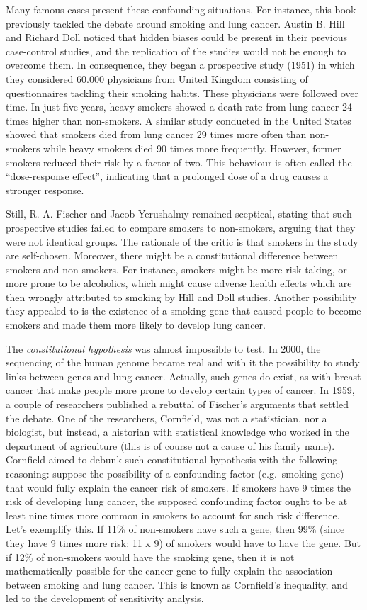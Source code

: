 \documentclass[
]{book}
\begin{document}
Many famous cases present these confounding situations. For instance, this book previously tackled the debate around smoking and lung cancer. Austin B. Hill and Richard Doll noticed that hidden biases could be present in their previous case-control studies, and the replication of the studies would not be enough to overcome them. In consequence, they began a prospective study (1951) in which they considered 60.000 physicians from United Kingdom consisting of questionnaires tackling their smoking habits. These physicians were followed over time. In just five years, heavy smokers showed a death rate from lung cancer 24 times higher than non-smokers. A similar study conducted in the United States showed that smokers died from lung cancer 29 times more often than non-smokers while heavy smokers died 90 times more frequently. However, former smokers reduced their risk by a factor of two. This behaviour is often called the ``dose-response effect'', indicating that a prolonged dose of a drug causes a stronger response.

Still, R. A. Fischer and Jacob Yerushalmy remained sceptical, stating that such prospective studies failed to compare smokers to non-smokers, arguing that they were not identical groups. The rationale of the critic is that smokers in the study are self-chosen. Moreover, there might be a constitutional difference between smokers and non-smokers. For instance, smokers might be more risk-taking, or more prone to be alcoholics, which might cause adverse health effects which are then wrongly attributed to smoking by Hill and Doll studies. Another possibility they appealed to is the existence of a smoking gene that caused people to become smokers and made them more likely to develop lung cancer.

The \emph{constitutional hypothesis} was almost impossible to test. In 2000, the sequencing of the human genome became real and with it the possibility to study links between genes and lung cancer. Actually, such genes do exist, as with breast cancer that make people more prone to develop certain types of cancer. In 1959, a couple of researchers published a rebuttal of Fischer's arguments that settled the debate. One of the researchers, Cornfield, was not a statistician, nor a biologist, but instead, a historian with statistical knowledge who worked in the department of agriculture (this is of course not a cause of his family name). Cornfield aimed to debunk such constitutional hypothesis with the following reasoning: suppose the possibility of a confounding factor (e.g.~smoking gene) that would fully explain the cancer risk of smokers. If smokers have 9 times the risk of developing lung cancer, the supposed confounding factor ought to be at least nine times more common in smokers to account for such risk difference. Let's exemplify this. If 11\% of non-smokers have such a gene, then 99\% (since they have 9 times more risk: 11 x 9) of smokers would have to have the gene. But if 12\% of non-smokers would have the smoking gene, then it is not mathematically possible for the cancer gene to fully explain the association between smoking and lung cancer. This is known as Cornfield's inequality, and led to the development of sensitivity analysis.
\end{document}
